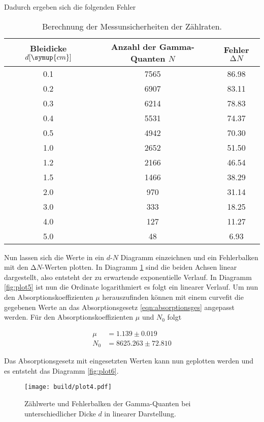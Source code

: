 \begin{flushleft}
Dadurch ergeben sich die folgenden Fehler
\end{flushleft}
\begin{table}
\centering
\caption{Berechnung der Messunsicherheiten der Zählraten.}
\label{tab:messwerte3}
\begin{tabular}{c c c}
    Bleidicke $d [\symup{cm}]$ & Anzahl der Gamma-Quanten $N$ & Fehler $\increment N$\\
    \midrule
    0.1 & 7565 & 86.98\\ 
    0.2 & 6907 & 83.11\\
    0.3 & 6214 & 78.83\\
    0.4 & 5531 & 74.37\\
    0.5 & 4942 & 70.30\\
    1.0 & 2652 & 51.50\\
    1.2 & 2166 & 46.54\\
    1.5 & 1466 & 38.29\\
    2.0 & 970  & 31.14\\
    3.0 & 333  & 18.25\\
    4.0 & 127  & 11.27\\
    5.0 & 48   & 6.93 \\
    \bottomrule
\end{tabular}
\end{table}
\begin{flushleft}
Nun lassen sich die Werte in ein $d$-$N$ Diagramm einzeichnen und ein Fehlerbalken mit den $\increment N$-Werten plotten. 
In Diagramm \ref{fig:plot4} sind die beiden Achsen linear dargestellt, also entsteht der zu erwartende exponentielle Verlauf.
In Diagramm \ref{fig:plot5} ist nun die Ordinate logarithmiert es folgt ein linearer Verlauf.
Um nun den Absorptionskoeffizienten $\mu$ herauszufinden können mit einem curvefit die gegebenen Werte an das Absorptionsgesetz \eqref{eqn:absorptionsges} angepasst werden.
Für den Absorptionskoeffizienten $\mu$ und $N_{0}$ folgt
\end{flushleft}
\begin{align}
\mu &= 1.139 \pm 0.019 \\
N_{0} &= 8625.263 \pm 72.810
\end{align}
\begin{flushleft}
Das Absorptionsgesetz mit eingesetzten Werten kann nun geplotten werden und es entsteht das Diagramm \ref{fig:plot6}.
\end{flushleft}
\newpage
\begin{figure}[t]
  \centering
  \texttt{[image: build/plot4.pdf]}
  \caption{Zählwerte und Fehlerbalken der Gamma-Quanten bei unterschiedlicher Dicke $d$ in linearer Darstellung.}
  \label{fig:plot4}
\end{figure}
